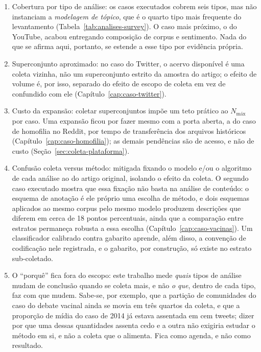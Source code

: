 \begin{enumerate}
  \item Cobertura por tipo de análise: os casos executados cobrem seis tipos, mas
  não instanciam a \emph{modelagem de tópico}, que é o quarto tipo mais frequente do
  levantamento (Tabela~\ref{tab:analises-survey}). O caso mais próximo, o do
  YouTube, acabou entregando composição de corpus e sentimento. Nada do que se
  afirma aqui, portanto, se estende a esse tipo por evidência própria.
  \item Superconjunto aproximado: no caso do Twitter, o acervo disponível
  é uma coleta vizinha, não um superconjunto estrito da amostra do artigo;
  o efeito de volume é, por isso, separado do efeito de escopo de coleta em vez de
  confundido com ele (Capítulo~\ref{cap:caso-twitter}).
  \item Custo da expansão: coletar superconjuntos impõe um teto prático ao
  $N_{\text{máx}}$ por caso. Uma expansão ficou por fazer mesmo com a porta aberta,
  a do caso de homofilia no Reddit, por tempo de transferência dos arquivos
  históricos (Capítulo~\ref{cap:caso-homofilia}); as demais pendências são de acesso,
  e não de custo (Seção~\ref{sec:coleta-plataforma}).
  \item Confusão coleta versus método: mitigada fixando o modelo e/ou o
  algoritmo de cada análise ao do artigo original, isolando o efeito da coleta.
  O segundo caso executado mostra que essa fixação não basta na análise de
  conteúdo: o esquema de anotação é ele próprio uma escolha de método, e dois
  esquemas aplicados ao mesmo corpus pelo mesmo modelo produzem descrições que
  diferem em cerca de 18 pontos percentuais, ainda que a comparação entre estratos
  permaneça robusta a essa escolha (Capítulo~\ref{cap:caso-vacinas}). Um
  classificador calibrado contra gabarito aprende, além disso, a convenção de
  codificação nele registrada, e o gabarito, por construção, só existe no estrato sub-coletado.
  \item O ``porquê'' fica fora do escopo: este trabalho mede \emph{quais} tipos de
  análise mudam de conclusão quando se coleta mais, e não \emph{o que}, dentro de cada
  tipo, faz com que mudem. Sabe-se, por exemplo, que a partição de comunidades do caso
  do debate vacinal ainda se movia em três quartos da coleta, e que a proporção de
  mídia do caso de 2014 já estava assentada em cem tweets; dizer por que uma dessas
  quantidades assenta cedo e a outra não exigiria estudar o método em si, e não a
  coleta que o alimenta. Fica como agenda, e não como resultado.
\end{enumerate}

